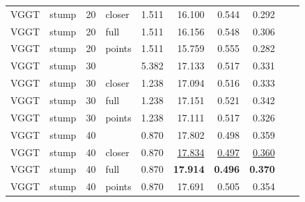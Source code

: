 \begin{table}[H]
\begin{tabular}{llrlrrrrlr}
VGGT & stump & 20 & closer & 1.511 & 16.100 & 0.544 & 0.292 &  &  \\
VGGT & stump & 20 & full & 1.511 & 16.156 & 0.548 & 0.306 &  &  \\
VGGT & stump & 20 & points & 1.511 & 15.759 & 0.555 & 0.282 &  &  \\
VGGT & stump & 30 &  & 5.382 & 17.133 & 0.517 & 0.331 &  &  \\
VGGT & stump & 30 & closer & 1.238 & 17.094 & 0.516 & 0.333 &  &  \\
VGGT & stump & 30 & full & 1.238 & 17.151 & 0.521 & 0.342 &  &  \\
VGGT & stump & 30 & points & 1.238 & 17.111 & 0.517 & 0.326 &  &  \\
VGGT & stump & 40 &  & 0.870 & 17.802 & 0.498 & 0.359 &  &  \\
VGGT & stump & 40 & closer & 0.870 & \underline{17.834} & \underline{0.497} & \underline{0.360} &  &  \\
VGGT & stump & 40 & full & 0.870 & \textbf{17.914} & \textbf{0.496} & \textbf{0.370} &  &  \\
VGGT & stump & 40 & points & 0.870 & 17.691 & 0.505 & 0.354 &  &  \\
\bottomrule
\end{tabular}
\end{table}